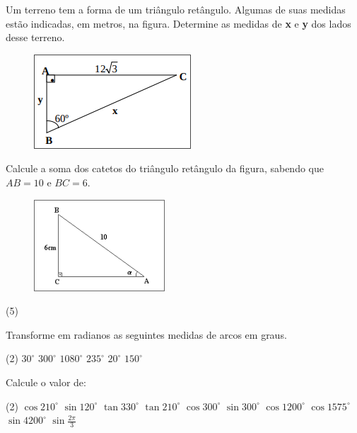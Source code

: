 \documentclass[a4paper,11pt,addpoints]{exam}
\begin{document}
\begin{questions}
\question[2] 
Um terreno tem a forma de um triângulo retângulo. Algumas de suas medidas estão indicadas, em metros, na figura. 
Determine as medidas de \textbf{x} e \textbf{y} dos lados desse terreno.

\begin{figure}[htb!]
  \centering
  \includegraphics[width=.3\linewidth]{figures/img1.png}
\end{figure}

\question[2] 
Calcule a soma dos catetos do triângulo retângulo da figura, sabendo que $AB = 10$ e $BC = 6$.


\begin{figure}[htb!]
  \centering
  \includegraphics[width=.3\linewidth]{figures/img2.png}
\end{figure}

\begin{tasks}(5)
\end{tasks}

\question[2]

Transforme em radianos as seguintes medidas de arcos em graus.

\begin{tasks}(2)
  \task $30^{\circ}$
  \task $300^{\circ}$
  \task $1080^{\circ}$
  \task $235^{\circ}$
  \task $20^{\circ}$
  \task $150^{\circ}$
\end{tasks}

\question[4]

Calcule o valor de:

\begin{tasks}(2)
  \task $\cos 210^\circ$
  \task $\sin 120^\circ$
  \task $\tan 330^\circ$
  \task $\tan 210^\circ$
  \task $\cos 300^\circ$
  \task $\sin 300^\circ$
  \task $\cos 1200^\circ$
  \task $\cos 1575^\circ$
  \task $\sin 4200^\circ$
  \task $\sin \frac{2\pi}{3}$
\end{tasks}


\end{questions}
\end{document}
